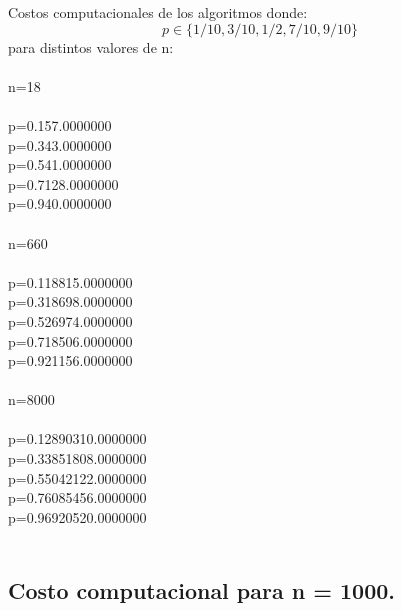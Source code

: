 \documentclass[12pt,letterpaper]{scrartcl}
\begin{document}
Costos computacionales de los algoritmos donde: \[p \in \{1/10, 3/10, 1/2, 7/10, 9/10\} \] para distintos valores de n:
\\\\
n=18
\\\\
	p=0.1\hspace{1cm}57.0000000
\\
	p=0.3\hspace{1cm}43.0000000
\\
	p=0.5\hspace{1cm}41.0000000
\\
	p=0.7\hspace{1cm}128.0000000
\\
	p=0.9\hspace{1cm}40.0000000
\\\\
n=660
\\\\
	p=0.1\hspace{1cm}18815.0000000
\\
	p=0.3\hspace{1cm}18698.0000000
\\
	p=0.5\hspace{1cm}26974.0000000
\\
	p=0.7\hspace{1cm}18506.0000000
\\
	p=0.9\hspace{1cm}21156.0000000
\\\\
n=8000
\\\\
	p=0.1\hspace{1cm}2890310.0000000
\\
	p=0.3\hspace{1cm}3851808.0000000
\\
	p=0.5\hspace{1cm}5042122.0000000
\\
	p=0.7\hspace{1cm}6085456.0000000
\\
	p=0.9\hspace{1cm}6920520.0000000
\\\\
\subsection{Costo computacional para n = 1000.}
\end{document}
